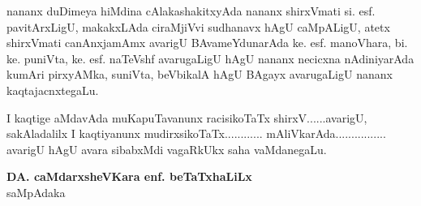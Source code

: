 nananx duDimeya hiMdina cAlakashakitxyAda nananx shirxVmati si. esf. pavitArxLigU, makakxLAda ciraMjiVvi sudhanavx hAgU caMpALigU, atetx shirxVmati canAnxjamAmx avarigU BAvameYdunarAda ke. esf. manoVhara, bi. ke. puniVta, ke. esf. naTeVshf avarugaLigU hAgU nananx necicxna nAdiniyarAda kumAri pirxyAMka, suniVta, beVbikalA hAgU BAgayx avarugaLigU nananx kaqtajacnxtegaLu.

I kaqtige aMdavAda muKapuTavanunx racisikoTaTx shirxV......avarigU, sakAladalilx I kaqtiyanunx mudirxsikoTaTx............ mAliVkarAda................ avarigU hAgU avara sibabxMdi vagaRkUkx saha vaMdanegaLu.

\begin{flushright}
{\bf DA. caMdarxsheVKara enf. beTaTxhaLiLx}\\[3pt]
saMpAdaka\qquad\qquad\,
\end{flushright}

\newpage
\thispagestyle{empty}
~\phantom{a}

\newpage
